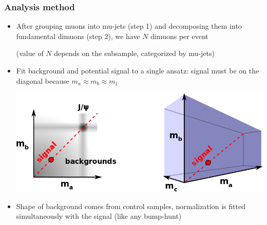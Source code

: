 \documentclass[compress]{beamer}
\begin{document}
\begin{frame}
\frametitle{Analysis method}
\begin{itemize}
\item After grouping muons into mu-jets (step 1) and decomposing them
  into fundamental dimuons (step 2), we have $N$ dimuons per event

  (value of $N$ depends on the subsample, categorized by mu-jets)

\item Fit background and potential signal to a single ansatz: signal
  must be on the diagonal because $m_a \approx m_b \approx m_1$

\begin{center}
\includegraphics[width=0.9\linewidth]{diagonal.png}
\end{center}

\item Shape of background comes from control samples, normalization
  is fitted simultaneously with the signal (like any bump-hunt)
\end{itemize}
\end{frame}
\end{document}
